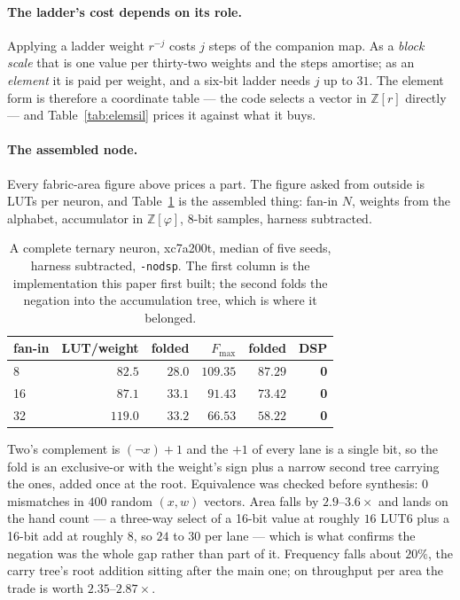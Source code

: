 \documentclass[11pt]{article}
\theoremstyle{definition}
\begin{document}
\paragraph{The ladder's cost depends on its role.} Applying a ladder weight
$r^{-j}$ costs $j$ steps of the companion map. As a \emph{block scale} that is
one value per thirty-two weights and the steps amortise; as an \emph{element} it
is paid per weight, and a six-bit ladder needs $j$ up to $31$. The element form
is therefore a coordinate table --- the code selects a vector in
$\mathbb{Z}[r]$ directly --- and Table~\ref{tab:elemsil} prices it against what
it buys.

\paragraph{The assembled node.} Every fabric-area figure above prices a part. The
figure asked from outside is LUTs per neuron, and Table~\ref{tab:node} is the
assembled thing: fan-in $N$, weights from the alphabet, accumulator in
$\mathbb{Z}[\varphi]$, 8-bit samples, harness subtracted.

\begin{table}[t]\centering
\caption{A complete ternary neuron, xc7a200t, median of five seeds, harness
subtracted, \texttt{-nodsp}. The first column is the implementation this paper
first built; the second folds the negation into the accumulation tree, which is
where it belonged.}
\label{tab:node}
\begin{tabular}{lrrrrr}
\toprule
fan-in & LUT/weight & folded & $F_{\max}$ & folded & DSP \\
\midrule
8  & $82.5$ & $\mathbf{28.0}$ & $109.35$ & $87.29$ & \textbf{0} \\
16 & $87.1$ & $\mathbf{33.1}$ & $91.43$ & $73.42$ & \textbf{0} \\
32 & $119.0$ & $\mathbf{33.2}$ & $66.53$ & $58.22$ & \textbf{0} \\
\bottomrule
\end{tabular}
\end{table}

Two's complement is $(\lnot x)+1$ and the $+1$ of every lane is a single bit, so
the fold is an exclusive-or with the weight's sign plus a narrow second tree
carrying the ones, added once at the root. Equivalence was checked before
synthesis: $0$ mismatches in $400$ random $(x,w)$ vectors. Area falls by
$2.9$--$3.6\times$ and lands on the hand count --- a three-way select of a
16-bit value at roughly $16$ LUT6 plus a 16-bit add at roughly $8$, so $24$ to
$30$ per lane --- which is what confirms the negation was the whole gap rather
than part of it. Frequency falls about $20\%$, the carry tree's root addition
sitting after the main one; on throughput per area the trade is worth
$2.35$--$2.87\times$.
\end{document}
